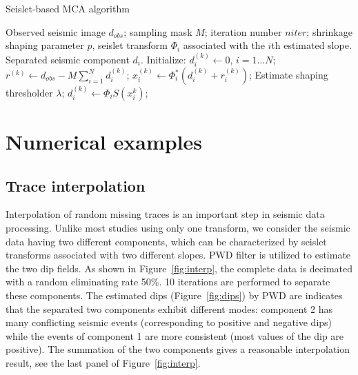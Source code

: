 
\begin{algorithm}[htb]
    \caption{Seislet-based MCA algorithm}\label{algorithm:lpmca}
    \begin{algorithmic}[1]
    \renewcommand{\algorithmicrequire}{\textbf{Input:}}
    \REQUIRE Observed seismic image $d_{obs}$; sampling mask $M$; iteration number $niter$; shrinkage shaping parameter $p$, seislet transform $\Phi_i$  associated with the $i$th estimated slope.
    \renewcommand{\algorithmicensure}{\textbf{Output:}}
    \ENSURE Separated seismic component $d_i$.
    \STATE Initialize: $d_i^{(k)}\leftarrow 0$, $ i=1\ldots N$;
            \STATE  $r^{(k)} \leftarrow d_{obs}-M\sum_{i=1}^N d_i^{(k)}$;
                \STATE  $x_i^{(k)}\leftarrow \Phi_i^*(d_i^{(k)}+r_i^{(k)})$;
                \STATE  Estimate shaping thresholder $\lambda$;
                \STATE  $d_i^{(k)}\leftarrow \Phi_i S(x_i^k) $;
            \ENDFOR
        \ENDFOR
    \end{algorithmic}
\end{algorithm}



\section{Numerical examples}

\subsection{Trace interpolation}

Interpolation of random missing traces is an important step in seismic data processing. Unlike most studies using only one transform, we consider the seismic data having two different components, which can be characterized by seislet transforms associated with two different slopes. PWD filter is utilized to estimate the two dip fields. As shown in Figure~\ref{fig:interp}, the complete data is decimated with a random eliminating rate 50\%. 10 iterations are performed to separate these components. The estimated dips (Figure~\ref{fig:dips}) by PWD are indicates that the separated two components exhibit different modes: component 2 has many conflicting seismic events (corresponding to positive and negative dips) while the events of component 1 are more consistent (most values of the dip are positive). The summation of the two components gives a reasonable interpolation result, see the last panel of Figure~\ref{fig:interp}.

